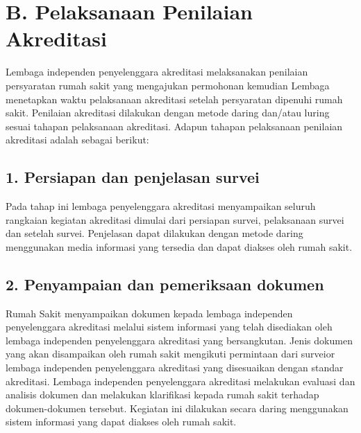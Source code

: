\documentclass[
]{book}
\begin{document}
\hypertarget{b.-pelaksanaan-penilaian-akreditasi}{%
\section*{B. Pelaksanaan Penilaian Akreditasi}\label{b.-pelaksanaan-penilaian-akreditasi}}

Lembaga independen penyelenggara akreditasi melaksanakan penilaian persyaratan rumah sakit yang mengajukan permohonan kemudian Lembaga menetapkan waktu pelaksanaan akreditasi setelah persyaratan dipenuhi rumah sakit. Penilaian akreditasi dilakukan dengan metode daring dan/atau luring sesuai tahapan pelaksanaan akreditasi. Adapun tahapan pelaksanaan penilaian akreditasi adalah sebagai berikut:

\hypertarget{persiapan-dan-penjelasan-survei}{%
\subsection*{1. Persiapan dan penjelasan survei}\label{persiapan-dan-penjelasan-survei}}

Pada tahap ini lembaga penyelenggara akreditasi menyampaikan seluruh rangkaian kegiatan akreditasi dimulai dari persiapan survei, pelaksanaan survei dan setelah survei. Penjelasan dapat dilakukan dengan metode daring menggunakan media informasi yang tersedia dan dapat diakses oleh rumah sakit.

\hypertarget{penyampaian-dan-pemeriksaan-dokumen}{%
\subsection*{2. Penyampaian dan pemeriksaan dokumen}\label{penyampaian-dan-pemeriksaan-dokumen}}

Rumah Sakit menyampaikan dokumen kepada lembaga independen penyelenggara akreditasi melalui sistem informasi yang telah disediakan oleh lembaga independen penyelenggara akreditasi yang bersangkutan. Jenis dokumen yang akan disampaikan oleh rumah sakit mengikuti permintaan dari surveior lembaga independen penyelenggara akreditasi yang disesuaikan dengan standar akreditasi. Lembaga independen penyelenggara akreditasi melakukan evaluasi dan analisis dokumen dan melakukan klarifikasi kepada rumah sakit terhadap dokumen-dokumen tersebut. Kegiatan ini dilakukan secara daring menggunakan sistem informasi yang dapat diakses oleh rumah sakit.
\end{document}
